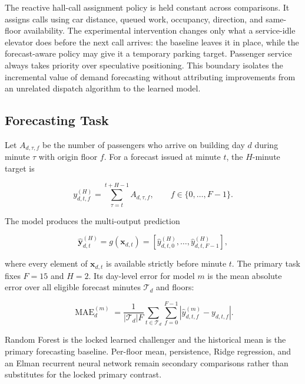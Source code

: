 \documentclass[12pt]{article}
\begin{document}
The reactive hall-call assignment policy is held constant across comparisons.
It assigns calls using car distance, queued work, occupancy, direction, and
same-floor availability. The experimental intervention changes only what a
service-idle elevator does before the next call arrives: the baseline leaves
it in place, while the forecast-aware policy may give it a temporary parking
target. Passenger service always takes priority over speculative positioning.
This boundary isolates the incremental value of demand forecasting without
attributing improvements from an unrelated dispatch algorithm to the learned
model.

\subsection{Forecasting Task}

Let $A_{d,\tau,f}$ be the number of passengers who arrive on building day $d$
during minute $\tau$ with origin floor $f$. For a forecast issued at minute
$t$, the $H$-minute target is

\begin{equation}
  y_{d,t,f}^{(H)} = \sum_{\tau=t}^{t+H-1} A_{d,\tau,f},
  \qquad f\in\{0,\ldots,F-1\}.
  \label{eq:forecast-target}
\end{equation}

The model produces the multi-output prediction

\begin{equation}
  \widehat{\mathbf{y}}_{d,t}^{(H)}
  = g(\mathbf{x}_{d,t})
  = \left[\widehat{y}_{d,t,0}^{(H)},\ldots,
  \widehat{y}_{d,t,F-1}^{(H)}\right],
  \label{eq:forecast-vector}
\end{equation}

where every element of $\mathbf{x}_{d,t}$ is available strictly before minute
$t$. The primary task fixes $F=15$ and $H=2$. Its day-level error for model
$m$ is the mean absolute error over all eligible forecast minutes $\mathcal{T}_d$
and floors:

\begin{equation}
  \operatorname{MAE}_{d}^{(m)} =
  \frac{1}{|\mathcal{T}_d|F}
  \sum_{t\in\mathcal{T}_d}\sum_{f=0}^{F-1}
  \left|\widehat{y}_{d,t,f}^{(m)}-y_{d,t,f}\right|.
  \label{eq:day-forecast-mae}
\end{equation}

Random Forest is the locked learned challenger and the historical mean is the
primary forecasting baseline. Per-floor mean, persistence, Ridge regression,
and an Elman recurrent neural network remain secondary comparisons rather than
substitutes for the locked primary contrast.
\end{document}
